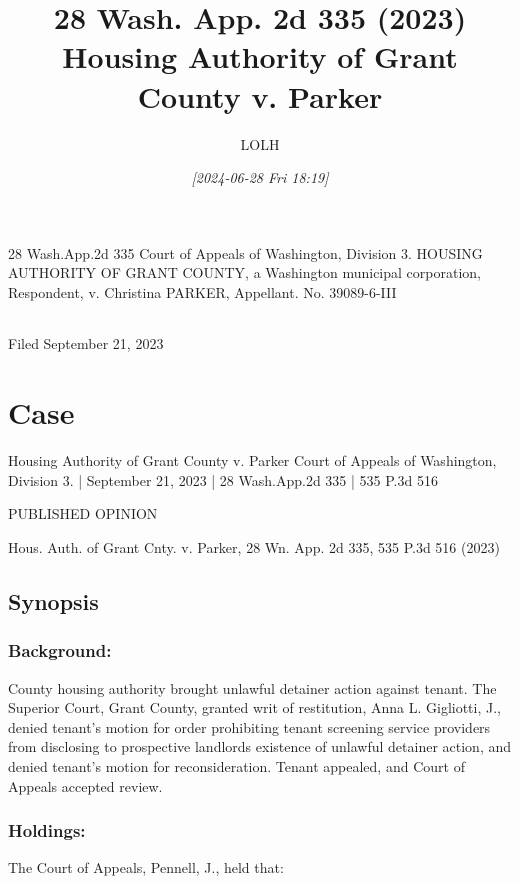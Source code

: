 \documentclass[11pt]{article}
\author{LOLH}
\date{\textit{[2024-06-28 Fri 18:19]}}
\title{28 Wash. App. 2d 335 (2023) Housing Authority of Grant County v. Parker}
\begin{document}
\maketitle
\tableofcontents

                          28 Wash.App.2d 335
             Court of Appeals of Washington, Division 3.
HOUSING AUTHORITY OF GRANT COUNTY, a Washington municipal corporation, Respondent,
                                  v.
                     Christina PARKER, Appellant.
                           No. 39089-6-III
\begin{center}
\begin{tabular}{}
\\[0pt]
\end{tabular}
\end{center}
Filed September 21, 2023

\section{Case}
\label{sec:org5228350}
Housing Authority of Grant County v. Parker
Court of Appeals of Washington, Division 3. | September 21, 2023 | 28 Wash.App.2d 335 | 535 P.3d 516

PUBLISHED OPINION

Hous. Auth. of Grant Cnty. v. Parker, 28 Wn. App. 2d 335, 535 P.3d 516 (2023)

\subsection{Synopsis}
\label{sec:org8447e68}

\subsubsection{Background:}
\label{sec:orga04130c}
County housing authority brought unlawful detainer action against tenant. The Superior Court, Grant County, granted writ of restitution, Anna L. Gigliotti, J., denied tenant’s motion for order prohibiting tenant screening service providers from disclosing to prospective landlords existence of unlawful detainer action, and denied tenant’s motion for reconsideration. Tenant appealed, and Court of Appeals accepted review.

\subsubsection{Holdings:}
\label{sec:orge62b5fb}
The Court of Appeals, Pennell, J., held that:
\end{document}
